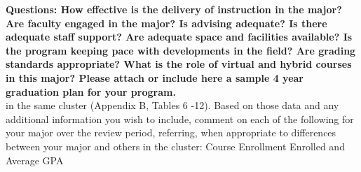 \documentclass[12pt]{article}
\begin{document}
{\bf Questions: How effective is the delivery of instruction in the major? Are faculty engaged 
in the major? Is advising adequate? Is there adequate staff support? Are adequate space and 
facilities available? Is the program keeping pace with developments in the field? Are grading 
standards appropriate? What is the role of virtual and hybrid courses in this major? Please 
attach or include here a sample 4 year graduation plan for your program.}\\[3pt]

in the same cluster (Appendix B, Tables 6 -12). Based on those data and any additional 
information you wish to include, comment on each of the following for your major over the 
review period, referring, when appropriate to differences between your major and others in the 
cluster:
Course Enrollment 
Enrolled and Average GPA 
\end{document}

